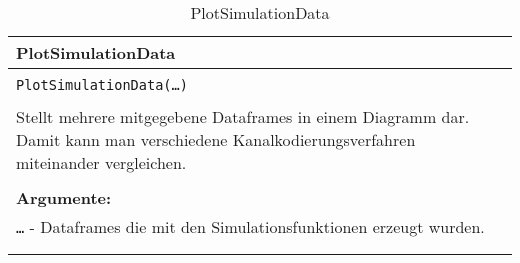\begin{longtable}{|p{\textwidth}|}
\hline
\rowcolor{lightblue}
PlotSimulationData\\
\hline
\\
\texttt{PlotSimulationData(\dots)}\\
\\
Stellt mehrere mitgegebene Dataframes in einem Diagramm dar. Damit kann man verschiedene Kanalkodierungsverfahren miteinander vergleichen.\\
\\
\textbf{Argumente:}\\
\texttt{\dots} - Dataframes die mit den Simulationsfunktionen erzeugt wurden.\\	
\\
\hline
\caption{PlotSimulationData}
\end{longtable}
